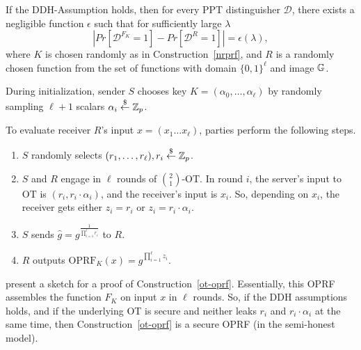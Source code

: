 \begin{theorem}
\label{theorem:naor}
If the DDH-Assumption holds, then for every PPT distinguisher
$\mathcal{D}$, there exists a negligible function $\epsilon$ such that
for sufficiently large $\lambda$
$$| Pr[\mathcal{D}^{F_K}=1] - Pr[\mathcal{D}^{R} = 1]|
    =\epsilon(\lambda), $$ where $K$ is chosen randomly as in
    Construction~\ref{nrprf}, and $R$ is a randomly chosen function
    from the set of functions with domain $\{0,1\}^\ell$ and image
    $\mathbb{G}$.

\end{theorem}

\begin{construction}
\label{ot-oprf}
  During initialization, sender $S$ chooses key
  $K=(\alpha_0,\ldots,\alpha_\ell)$ by randomly sampling $\ell+1$
  scalars $\alpha_i\stackrel{\$}{\leftarrow}\mathbb{Z}_p$.

  To evaluate receiver $R$'s input $x=(x_1\ldots{}x_\ell)$, parties perform the following steps.
  \begin{enumerate}
  \item $S$ randomly selects $(r_1,\ldots,r_\ell),r_i\stackrel{\$}{\leftarrow}\mathbb{Z}_p$.
  \item $S$ and $R$ engage in $\ell$ rounds of $\binom{2}{1}$-OT. In round
    $i$, the server's input to OT is $(r_i,r_i\cdot\alpha_i)$, and the
    receiver's input is $x_i$. So, depending on $x_i$, the receiver gets either $z_i=r_i$ or $z_i=r_i\cdot{}\alpha_i$.
  \item $S$ sends $\hat{g}=g^{\frac{1}{\prod_{i=1}^{\ell}r_i}}$ to $R$.
    \item $R$ outputs $\text{OPRF}_K(x)=\hat{g}^{\prod^{\ell}_{i=1}z_i}$.
    
    \end{enumerate}
\end{construction}

\citet{oprf} present a sketch for a proof of
Construction~\ref{ot-oprf}. Essentially, this OPRF assembles the
\citeauthor{prf} function $F_K$ on input $x$ in $\ell$ rounds.  So, if
the DDH assumptions holds, and if the underlying OT is secure and
neither leaks $r_i$ and $r_i\cdot\alpha_i$ at the same time, then
Construction~\ref{ot-oprf} is a secure OPRF (in the semi-honest
model).

